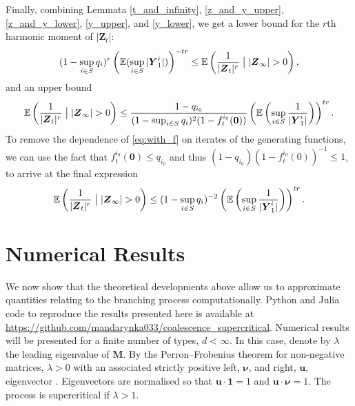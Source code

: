 \documentclass[preprint,3p,12pt]{elsarticle}
\theoremstyle{definition}
\begin{document}
Finally, combining Lemmata \ref{t_and_infinity}, \ref{z_and_y_upper}, \ref{z_and_y_lower}, \ref{y_upper}, and \ref{y_lower}, we get a lower bound for the $r$th harmonic moment of $|\boldsymbol{Z}_t|$:
\begin{equation*}
    (1-\sup_{i \in S} q_i)^r 
\left(  \mathbb{E}(\sup_{i \in S}|\boldsymbol{Y}_1^i|) \right)^{-tr} \le 
    \mathbb{E}\left(\frac{1}{|\boldsymbol{Z}_t|^{r}}\bigm| |\boldsymbol{Z}_{\infty}| > 0\right),
\end{equation*}
and an upper bound
\begin{equation}
      \mathbb{E}\left(\frac{1}{|\boldsymbol{Z}_t|^r}\bigm| |\boldsymbol{Z}_{\infty}| > 0\right)  \le  \frac{1-q_{i_0}}{    (1-\sup_{i \in S}q_i)^2(1-f_t^{i_0}(\boldsymbol{0}))  } \left( \mathbb{E}\left(\sup_{i \in S}\frac{1}{|\boldsymbol{Y}_1^i|}\right)\right)^{tr}. \label{eq:with_f}
\end{equation}
To remove the dependence of \eqref{eq:with_f} on iterates of the generating functions, we can use the fact that $f_t^{i_0}(\boldsymbol{0}) \le q_{i_0}$ and thus $(1-q_{i_0})(1-f_t^{i_0}(0))^{-1} \leq 1$,  to arrive at the final expression 
\begin{equation*}
    \mathbb{E}\left(\frac{1}{|\boldsymbol{Z}_t|^r}\bigm| |\boldsymbol{Z}_{\infty}| > 0\right) 
    \le (1-\sup_{i \in S}q_i)^{-2} \left(\mathbb{E}\left(\sup_{i \in S} \frac{1}{|\boldsymbol{Y}_1^i|}\right)\right)^{tr}.
\end{equation*}
\section{Numerical Results} \label{sec:numerical}
We now show that the theoretical developments above allow us to approximate quantities relating to the branching process computationally. Python and Julia code to reproduce the results presented here is available at \url{https://github.com/mandarynka033/coalescence_supercritical}. Numerical results will be presented for a finite number of types, $d < \infty$. In this case, denote by $\lambda$ the leading eigenvalue of $\boldsymbol{M}$. By the Perron--Frobenius theorem for non-negative matrices, $\lambda > 0$ with an associated strictly positive left, $\boldsymbol{\nu}$, and right, $\boldsymbol{u}$, eigenvector \cite[Chapter 1.1]{seneta}. Eigenvectors are normalised so that  $\boldsymbol{u}\cdot \boldsymbol{1} =1 $ and $ \boldsymbol{u} \cdot \boldsymbol{\nu} =1$. The process is supercritical if $\lambda > 1$. 
\end{document}
